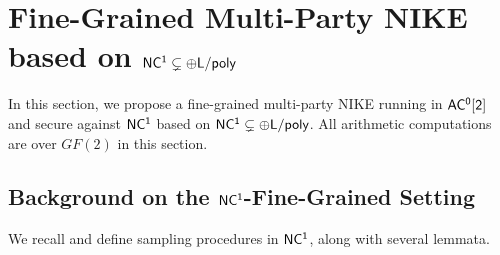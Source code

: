 \section{Fine-Grained Multi-Party NIKE based on $\mathsf{NC^1} \subsetneq {\sf \oplus L/poly}$}
\label{sec:nc1-nike}
In this section, we propose a fine-grained multi-party NIKE running in $\mathsf{AC^0[2]}$ and secure against $\mathsf{NC^1}$ based on $\mathsf{NC^1} \subsetneq {\sf \oplus L/poly}$. 
All arithmetic computations are over $GF(2)$ in this section. %

\subsection{Background on the $\mathsf{NC^1}$-Fine-Grained Setting}
\label{sec:samp}
We recall and define sampling procedures in $\mathsf{NC^1}$, along with several lemmata. 

